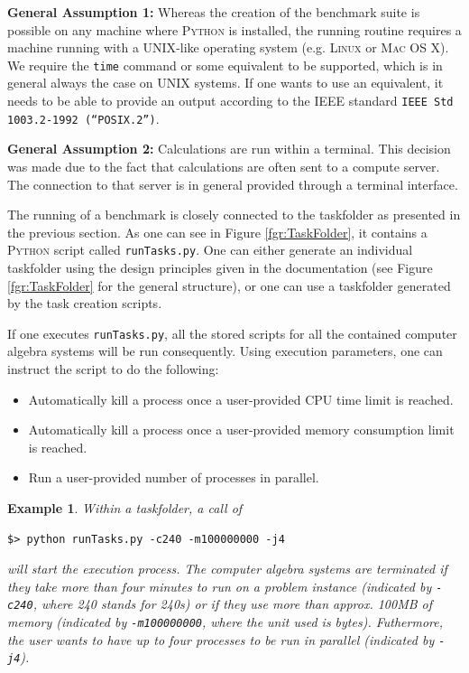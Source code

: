 \documentclass[12pt]{article}
\newtheorem{example}{Example}
\begin{document}
\textbf{General Assumption 1:} Whereas the creation of the benchmark suite is
possible on any machine where \textsc{Python} is installed, the running routine
requires a machine running with a \textsc{UNIX}-like operating system
(e.g. \textsc{Linux} or \textsc{Mac OS X}). We require the \texttt{time}
command or some equivalent to be supported, which is in general always the case
on \textsc{UNIX} systems. If one wants to use an equivalent, it needs to be
able to provide an output according to the \textsc{IEEE} standard \texttt{IEEE
  Std 1003.2-1992 (``POSIX.2'')}.

\noindent\textbf{General Assumption 2:} Calculations are run within a
terminal. This decision was made due to the fact that calculations are often
sent to a compute server. The connection to that server is in general provided
through a terminal interface.

The running of a benchmark is closely connected to the taskfolder as presented
in the previous section. As one can see in Figure \ref{fgr:TaskFolder}, it
contains a \textsc{Python} script called \texttt{runTasks.py}. One can either
generate an individual taskfolder using the design principles given in the
documentation (see Figure \ref{fgr:TaskFolder} for the general structure), or
one can use a taskfolder generated by the task creation scripts.

If one executes \texttt{runTasks.py}, all the stored scripts for all the
contained computer algebra systems will be run consequently. Using execution
parameters, one can instruct the script to do the following:
\begin{itemize}
\item Automatically kill a process once a user-provided CPU time limit is
  reached.
\item Automatically kill a process once a user-provided memory consumption
  limit is reached.
\item Run a user-provided number of processes in parallel.
\end{itemize}

\begin{example}
Within a taskfolder, a call of

{\small{\begin{verbatim}$> python runTasks.py -c240 -m100000000 -j4 \end{verbatim}}}%

\noindent will start the execution process. The computer algebra
systems are terminated if they take more than four minutes to run on a problem
instance (indicated by \texttt{-c240}, where 240 stands for 240s) or if they
use more than approx. 100MB of memory (indicated by \texttt{-m100000000}, where
the unit used is bytes). Futhermore, the user wants to have up to four
processes to be run in parallel (indicated by \texttt{-j4}).
\end{example}
\end{document}

